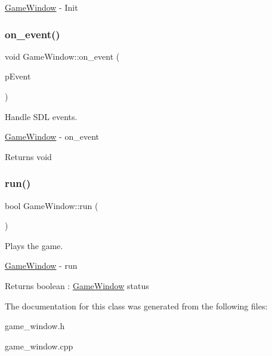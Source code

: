 \hyperlink{classGameWindow}{Game\+Window} -\/ Init \mbox{\label{classGameWindow_a234682d6db685f5d27fc857a8379c4cb}} 
\subsubsection{\texorpdfstring{on\+\_\+event()}{on\_event()}}
{\footnotesize\ttfamily void Game\+Window\+::on\+\_\+event (\begin{DoxyParamCaption}\item[{S\+D\+L\+\_\+\+Event $\ast$}]{p\+Event }\end{DoxyParamCaption})}



Handle S\+DL events. 

\hyperlink{classGameWindow}{Game\+Window} -\/ on\+\_\+event \begin{DoxyReturn}{Returns}
void 
\end{DoxyReturn}
\mbox{\label{classGameWindow_a7438d7948280897671b5dc775e8c770e}} 
\subsubsection{\texorpdfstring{run()}{run()}}
{\footnotesize\ttfamily bool Game\+Window\+::run (\begin{DoxyParamCaption}{ }\end{DoxyParamCaption})}



Plays the game. 

\hyperlink{classGameWindow}{Game\+Window} -\/ run \begin{DoxyReturn}{Returns}
boolean \+: \hyperlink{classGameWindow}{Game\+Window} status 
\end{DoxyReturn}


The documentation for this class was generated from the following files\+:\begin{DoxyCompactItemize}
\item 
game\+\_\+window.\+h\item 
game\+\_\+window.\+cpp\end{DoxyCompactItemize}
